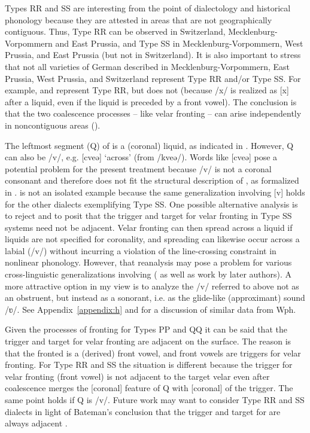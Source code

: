 Types RR and SS are interesting from the point of dialectology and historical phonology because they are attested in areas that are not geographically contiguous. Thus, Type RR can be observed in Switzerland, Mecklenburg-Vorpommern and East Prussia, and Type SS in Mecklenburg-Vorpommern, West Prussia, and East Prussia (but not in Switzerland). It is also important to stress that not all varieties of German described in Mecklenburg-Vorpommern, East Prussia, West Prussia, and Switzerland represent Type RR and/or Type SS. For example,  and  represent Type RR, but  does not (because /x/ is realized as [x] after a liquid, even if the liquid is preceded by a front vowel). The conclusion is that the two coalescence processes -- like velar fronting -- can arise independently in noncontiguous areas ().

The leftmost segment (Q) of  is a (coronal) liquid, as indicated in . However, Q can also be /v/, e.g.  [cveə] ‘across’ (from /kveə/). Words like [cveə] pose a potential problem for the present treatment because /v/ is not a coronal consonant and therefore does not fit the structural description of , as formalized in .  is not an isolated example because the same generalization involving [v] holds for the other dialects exemplifying Type SS. One possible alternative analysis is to reject  and to posit that the trigger and target for velar fronting in Type SS systems need not be adjacent. Velar fronting can then spread across a liquid if liquids are not specified for coronality, and spreading can likewise occur across a labial (/v/) without incurring a violation of the line-crossing constraint in nonlinear phonology. However, that reanalysis may pose a problem for various cross-linguistic generalizations involving  (\citealt{Odden1994} as well as work by later authors). A more attractive option in my view is to analyze the /v/ referred to above not as an obstruent, but instead as a sonorant, i.e. as the glide-like (approximant) sound /ʋ/. See Appendix~\ref{appendix:h} and \citet{Hall2014c} for a discussion of similar data from Wph.

Given the processes of  fronting for Types PP and QQ it can be said that the trigger and target for velar fronting are adjacent on the surface. The reason is that the fronted  is a (derived) front vowel, and front vowels are triggers for velar fronting. For Type RR and SS the situation is different because the trigger for velar fronting (front vowel) is not adjacent to the target velar even after coalescence merges the [coronal] feature of Q with [coronal] of the trigger. The same point holds if Q is /v/. Future work may want to consider Type RR and SS dialects in light of Bateman’s conclusion that the trigger and target for  are always adjacent \citep[77-82]{Bateman2007}.

